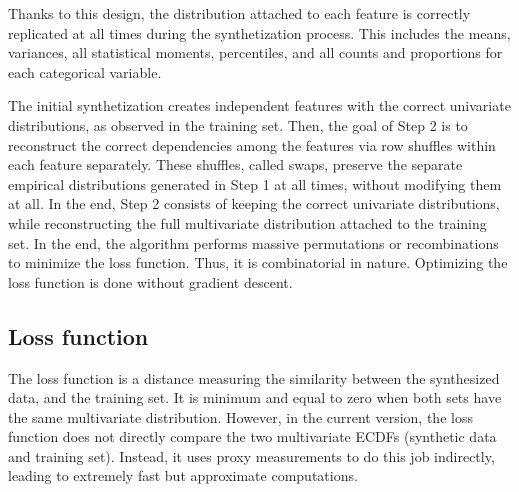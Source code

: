 \documentclass[oneside,10pt]{book}
\begin{document}
\noindent Thanks to this design, the distribution attached to each feature is correctly replicated at all times during the synthetization process. This includes the means, variances, all statistical moments, percentiles, and all counts and proportions for each categorical variable.

The initial synthetization creates independent features with the correct univariate distributions, as observed in the training set. Then, the goal of Step 2 is to reconstruct
 the correct dependencies among the features via row shuffles within each feature separately. These shuffles, called \textcolor{index}{swaps}, preserve the separate empirical distributions generated in Step 1 at all times, without modifying them at all. In the end, Step 2 consists of keeping the correct univariate
 distributions, while reconstructing the full multivariate distribution attached to the training set. In the end, the algorithm performs massive permutations or recombinations to minimize the loss function. Thus, it is combinatorial in nature. Optimizing the loss function is done without \textcolor{index}{gradient descent}. 

\subsection{Loss function}\label{ffgdfdsss}

The \textcolor{index}{loss function} is a distance measuring the similarity between the synthesized data, and the training set. It is minimum and equal to zero when both sets have the same multivariate distribution. However, in the current version, the loss function does not directly compare the two multivariate ECDFs (synthetic data and training set). Instead, it uses proxy measurements to do this job indirectly, leading to extremely fast but approximate computations.
\end{document}
